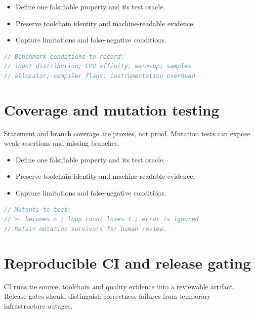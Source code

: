 \documentclass[11pt]{article}
\begin{document}
\begin{itemize}[leftmargin=*,itemsep=1pt,topsep=3pt]
\item Define one falsifiable property and its test oracle.
\item Preserve toolchain identity and machine-readable evidence.
\item Capture limitations and false-negative conditions.
\end{itemize}
\begin{lstlisting}[language=C++]
// Benchmark conditions to record:
// input distribution; CPU affinity; warm-up; samples
// allocator; compiler flags; instrumentation overhead
\end{lstlisting}
\section{Coverage and mutation testing}
Statement and branch coverage are proxies, not proof. Mutation tests can expose weak assertions and missing branches.

\begin{itemize}[leftmargin=*,itemsep=1pt,topsep=3pt]
\item Define one falsifiable property and its test oracle.
\item Preserve toolchain identity and machine-readable evidence.
\item Capture limitations and false-negative conditions.
\end{itemize}
\begin{lstlisting}[language=C++]
// Mutants to test:
// >= becomes > ; loop count loses 1 ; error is ignored
// Retain mutation survivors for human review.
\end{lstlisting}
\section{Reproducible CI and release gating}
CI runs tie source, toolchain and quality evidence into a reviewable artifact. Release gates should distinguish correctness failures from temporary infrastructure outages.
\end{document}
